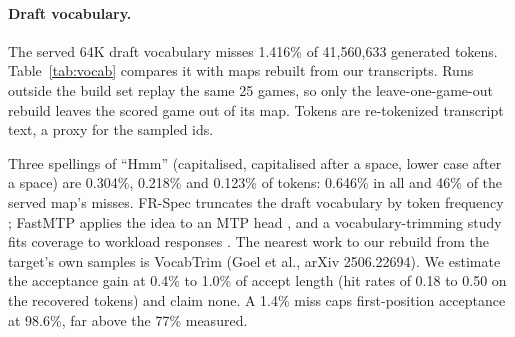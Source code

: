 \paragraph{Draft vocabulary.}
The served 64K draft vocabulary misses 1.416\% of 41,560,633 generated tokens. %
Table~\ref{tab:vocab} compares it with maps rebuilt from our transcripts.
Runs outside the build set replay the same 25 games, so only the leave-one-game-out rebuild leaves the scored game out of its map. Tokens are re-tokenized transcript text, a proxy for the sampled ids. %

\begin{table}[!htb]
\caption{Generated tokens missing from the draft vocabulary (lower is better). The build set is seven development runs; the three further runs play the same 25 games. Own maps are built from our traffic at 32K and 64K entries.}\label{tab:vocab}
\centering\footnotesize
\setlength{\tabcolsep}{3pt}
\end{table}

Three spellings of ``Hmm'' (capitalised, capitalised after a space, lower case after a space) are 0.304\%, 0.218\% and 0.123\% of tokens: 0.646\% in all and 46\% of the served map's misses. %
FR-Spec truncates the draft vocabulary by token frequency \citep{zhao2025frspec}; FastMTP applies the idea to an MTP head \citep{cai2025fastmtp}, and a vocabulary-trimming study fits coverage to workload responses \citep{benshoham2026vocabtrim}. The nearest work to our rebuild from the target's own samples is VocabTrim (Goel et al., arXiv 2506.22694). %
We estimate the acceptance gain at 0.4\% to 1.0\% of accept length (hit rates of 0.18 to 0.50 on the recovered tokens) and claim none. A 1.4\% miss caps first-position acceptance at 98.6\%, far above the 77\% measured. %

